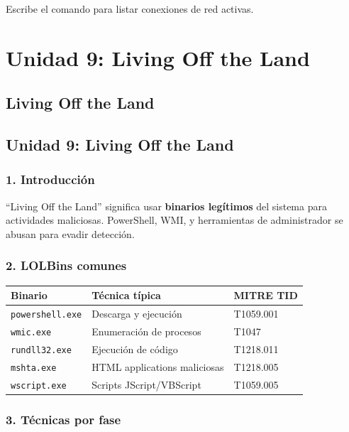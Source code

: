 \documentclass[
  letterpaper,
]{report}
\newcounter{none} %
\begin{document}
Escribe el comando para listar conexiones de red activas.

\part{Unidad 9: Living Off the Land}

\chapter{Living Off the Land}\label{living-off-the-land}

\chapter{Unidad 9: Living Off the
Land}\label{unidad-9-living-off-the-land-1}

\section{1. Introducción}\label{introducciuxf3n-8}

``Living Off the Land'' significa usar \textbf{binarios legítimos} del
sistema para actividades maliciosas. PowerShell, WMI, y herramientas de
administrador se abusan para evadir detección.

\section{2. LOLBins comunes}\label{lolbins-comunes}

{\def\LTcaptype{none} %
\begin{longtable}[]{@{}lll@{}}
\toprule\noalign{}
Binario & Técnica típica & MITRE TID \\
\midrule\noalign{}
\endhead
\bottomrule\noalign{}
\endlastfoot
\texttt{powershell.exe} & Descarga y ejecución & T1059.001 \\
\texttt{wmic.exe} & Enumeración de procesos & T1047 \\
\texttt{rundll32.exe} & Ejecución de código & T1218.011 \\
\texttt{mshta.exe} & HTML applications maliciosas & T1218.005 \\
\texttt{wscript.exe} & Scripts JScript/VBScript & T1059.005 \\
\end{longtable}
}

\section{3. Técnicas por fase}\label{tuxe9cnicas-por-fase}
\end{document}
